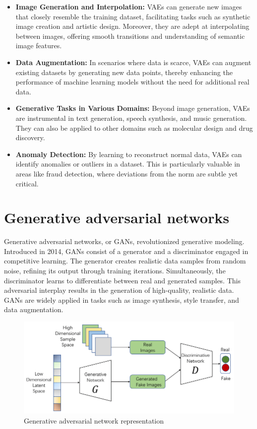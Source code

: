 \documentclass{article}
\begin{document}
			\begin{itemize}
				\item \textbf{Image Generation and Interpolation:} VAEs can generate new images that closely resemble the training dataset, facilitating tasks such as synthetic image creation and artistic design. Moreover, they are adept at interpolating between images, offering smooth transitions and understanding of semantic image features.
				
				\item \textbf{Data Augmentation:} In scenarios where data is scarce, VAEs can augment existing datasets by generating new data points, thereby enhancing the performance of machine learning models without the need for additional real data.
				
				\item \textbf{Generative Tasks in Various Domains:} Beyond image generation, VAEs are instrumental in text generation, speech synthesis, and music generation. They can also be applied to other domains such as molecular design and drug discovery.
				
				\item \textbf{Anomaly Detection:} By learning to reconstruct normal data, VAEs can identify anomalies or outliers in a dataset. This is particularly valuable in areas like fraud detection, where deviations from the norm are subtle yet critical.
			\end{itemize}

	\section{Generative adversarial networks}

		Generative adversarial networks, or GANs, revolutionized generative modeling. Introduced in 2014, GANs consist of a generator and a discriminator engaged in competitive learning. The generator creates realistic data samples from random noise, refining its output through training iterations. Simultaneously, the discriminator learns to differentiate between real and generated samples. This adversarial interplay results in the generation of high-quality, realistic data. GANs are widely applied in tasks such as image synthesis, style transfer, and data augmentation.

		\begin{figure}[H]
			\centering
			\includegraphics[width=0.8\linewidth]{images/gan-arhitecture.png}
			\caption{Generative adversarial network representation}
			\label{fig:gan}
		\end{figure}
\end{document}
